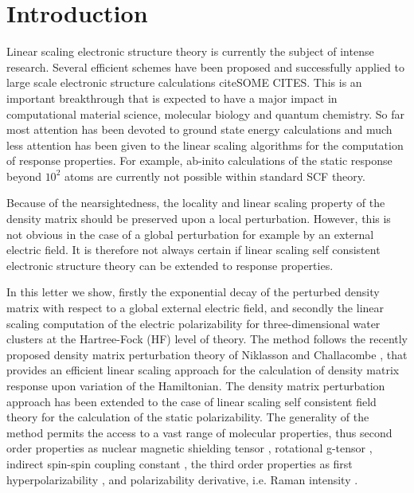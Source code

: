 \documentclass[twocolumn,showpacs,preprintnumbers,amsmath,amssymb]{revtex4}
\begin{document}
\section{Introduction}
 Linear scaling electronic structure theory is
 currently the subject of
 intense research. Several efficient schemes have been 
 proposed and successfully applied to large scale electronic
 structure calculations cite{SOME CITES}. This is an important
 breakthrough that is expected to have a major impact in computational
 material science, molecular biology and quantum chemistry.
 So far most attention
 has been devoted to ground state energy calculations and much less
 attention has been given to the linear scaling algorithms
 for the computation of response properties. %
 For example, ab-inito calculations of the static response beyond 
 $10^2$ atoms are currently not possible within  
 standard SCF theory. 

 Because of the nearsightedness, the locality and linear
 scaling property of the density matrix should be preserved 
 upon a local perturbation. However, this is not
 obvious in the case of a global perturbation 
 for example by an external electric field. 
 It is therefore not always certain if linear scaling self consistent 
 electronic structure theory can be extended to response properties.

 In this letter we show, firstly the exponential 
 decay of the perturbed density matrix with respect to a global
 external electric field, and secondly the linear scaling computation 
 of the electric polarizability for three-dimensional water clusters at
 the Hartree-Fock (HF) level of theory.
 The method follows the recently proposed
 density matrix perturbation theory
 of Niklasson and Challacombe \cite{Anders}, that provides
 an efficient linear scaling approach for the calculation of
 density matrix response upon variation of the Hamiltonian.
 The density matrix perturbation approach has been extended
 to the case of linear scaling self consistent field theory 
 for the calculation of the static polarizability.
 The generality of the method permits the access to a vast range
 of molecular properties, thus second order properties as 
 nuclear magnetic shielding tensor \cite{Pulay_1990}, rotational
 g-tensor \cite{Helgaker_1996}, indirect spin-spin
 coupling constant \cite{Pennington_1991,Malkin_1996}, the third order
 properties as first hyperpolarizability \cite{Franky_1997}, and
 polarizability derivative, i.e. Raman intensity
 \cite{Lazzeri_2003,Champagne_2001}.
\end{document}
